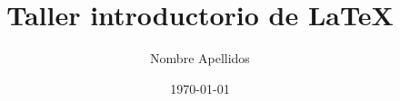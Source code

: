 \title{Taller introductorio de \LaTeX}
\author{Nombre Apellidos}
\date{\today}
\maketitle
\tableofcontents
